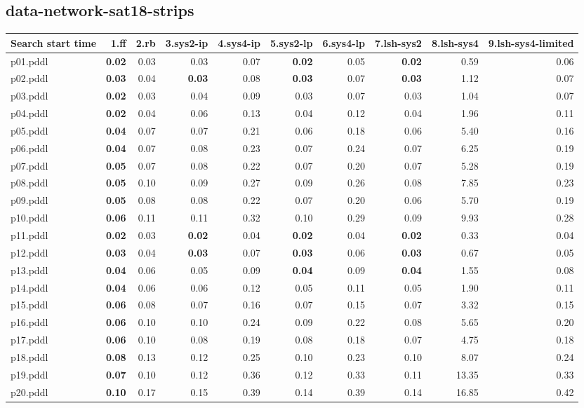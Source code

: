 \documentclass{article}
\begin{document}
\hypertarget{search_start_time-data-network-sat18-strips}{}
\subsection*{data-network-sat18-strips}

\begin{tabular}{@{}lrrrrrrrrr@{}}
Search start time & 1.ff & 2.rb & 3.sys2-ip & 4.sys4-ip & 5.sys2-lp & 6.sys4-lp & 7.lsh-sys2 & 8.lsh-sys4 & 9.lsh-sys4-limited \\
\midrule
p01.pddl & \textbf{0.02} & 0.03 & 0.03 & 0.07 & \textbf{0.02} & 0.05 & \textbf{0.02} & 0.59 & 0.06 \\
p02.pddl & \textbf{0.03} & 0.04 & \textbf{0.03} & 0.08 & \textbf{0.03} & 0.07 & \textbf{0.03} & 1.12 & 0.07 \\
p03.pddl & \textbf{0.02} & 0.03 & 0.04 & 0.09 & 0.03 & 0.07 & 0.03 & 1.04 & 0.07 \\
p04.pddl & \textbf{0.02} & 0.04 & 0.06 & 0.13 & 0.04 & 0.12 & 0.04 & 1.96 & 0.11 \\
p05.pddl & \textbf{0.04} & 0.07 & 0.07 & 0.21 & 0.06 & 0.18 & 0.06 & 5.40 & 0.16 \\
p06.pddl & \textbf{0.04} & 0.07 & 0.08 & 0.23 & 0.07 & 0.24 & 0.07 & 6.25 & 0.19 \\
p07.pddl & \textbf{0.05} & 0.07 & 0.08 & 0.22 & 0.07 & 0.20 & 0.07 & 5.28 & 0.19 \\
p08.pddl & \textbf{0.05} & 0.10 & 0.09 & 0.27 & 0.09 & 0.26 & 0.08 & 7.85 & 0.23 \\
p09.pddl & \textbf{0.05} & 0.08 & 0.08 & 0.22 & 0.07 & 0.20 & 0.06 & 5.70 & 0.19 \\
p10.pddl & \textbf{0.06} & 0.11 & 0.11 & 0.32 & 0.10 & 0.29 & 0.09 & 9.93 & 0.28 \\
p11.pddl & \textbf{0.02} & 0.03 & \textbf{0.02} & 0.04 & \textbf{0.02} & 0.04 & \textbf{0.02} & 0.33 & 0.04 \\
p12.pddl & \textbf{0.03} & 0.04 & \textbf{0.03} & 0.07 & \textbf{0.03} & 0.06 & \textbf{0.03} & 0.67 & 0.05 \\
p13.pddl & \textbf{0.04} & 0.06 & 0.05 & 0.09 & \textbf{0.04} & 0.09 & \textbf{0.04} & 1.55 & 0.08 \\
p14.pddl & \textbf{0.04} & 0.06 & 0.06 & 0.12 & 0.05 & 0.11 & 0.05 & 1.90 & 0.11 \\
p15.pddl & \textbf{0.06} & 0.08 & 0.07 & 0.16 & 0.07 & 0.15 & 0.07 & 3.32 & 0.15 \\
p16.pddl & \textbf{0.06} & 0.10 & 0.10 & 0.24 & 0.09 & 0.22 & 0.08 & 5.65 & 0.20 \\
p17.pddl & \textbf{0.06} & 0.10 & 0.08 & 0.19 & 0.08 & 0.18 & 0.07 & 4.75 & 0.18 \\
p18.pddl & \textbf{0.08} & 0.13 & 0.12 & 0.25 & 0.10 & 0.23 & 0.10 & 8.07 & 0.24 \\
p19.pddl & \textbf{0.07} & 0.10 & 0.12 & 0.36 & 0.12 & 0.33 & 0.11 & 13.35 & 0.33 \\
p20.pddl & \textbf{0.10} & 0.17 & 0.15 & 0.39 & 0.14 & 0.39 & 0.14 & 16.85 & 0.42 \\
\end{tabular}
\end{document}
